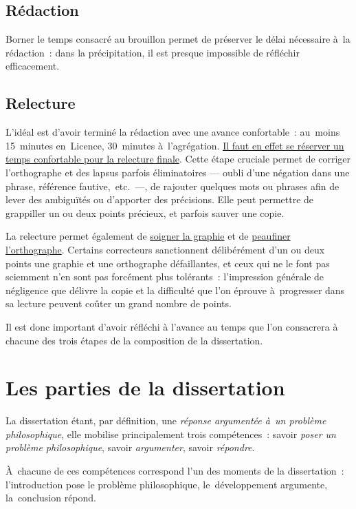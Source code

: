 \documentclass[a4paper,12pt]{report}
\begin{document}
\chapter{Rédaction}
\label{sec:org8e47bd8}

Borner le temps consacré au brouillon permet de préserver le délai
nécessaire à la rédaction : dans la précipitation, il est presque
impossible de réfléchir efficacement.


\chapter{Relecture}
\label{sec:org769ab0c}

L'idéal est d'avoir terminé la rédaction avec une avance confortable :
au moins 15 minutes en Licence, 30 minutes à l'agrégation. \uline{Il faut en
effet se réserver un temps confortable pour la relecture finale}. Cette
étape cruciale permet de corriger l'orthographe et des lapsus parfois
éliminatoires — oubli d'une négation dans une phrase, référence
fautive, etc. —, de rajouter quelques mots ou phrases afin de lever des
ambiguïtés ou d'apporter des précisions. Elle peut permettre de
grappiller un ou deux points précieux, et parfois sauver une copie.

La relecture permet également de \uline{soigner la graphie} et de \uline{peaufiner
l'orthographe}. Certains correcteurs sanctionnent délibérément d'un ou
deux points une graphie et une orthographe défaillantes, et ceux qui ne
le font pas sciemment n'en sont pas forcément plus tolérants :
l'impression générale de négligence que délivre la copie et la
difficulté que l'on éprouve à progresser dans sa lecture peuvent coûter
un grand nombre de points.

Il est donc important d'avoir réfléchi à l'avance au temps que l'on
consacrera à chacune des trois étapes de la composition de la
dissertation.


\part{Les parties de la dissertation}
\label{sec:org21ed3d5}

La dissertation étant, par définition, une \emph{réponse argumentée à un
problème philosophique}, elle mobilise principalement trois
compétences : savoir \emph{poser un problème philosophique}, savoir
\emph{argumenter}, savoir \emph{répondre}.

À chacune de ces compétences correspond l'un des moments de la
dissertation : l'introduction pose le problème philosophique,
le développement argumente, la conclusion répond.
\end{document}
